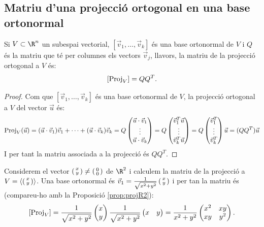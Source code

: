 \subsection{Matriu d'una projecció ortogonal en una base ortonormal}
\begin{proposicio}
Si $V\subset \R^n$ un subespai vectorial, $[\vec v_1, \dots, \vec v_k]$ és una base ortonormal de $V$ i $Q$ és la matriu que té per columnes els vectors $\vec v_j$, llavors, la matriu de la projecció ortogonal a $V$ és:
\[
[\operatorname{Proj}_V]=Q Q^T.
\]
\end{proposicio}
 \begin{proof}
 Com que $[\vec v_1, \dots, \vec v_k]$ és una base ortonormal de $V$, la projecció ortogonal a $V$ del vector $\vec u$ és:
 \[
 \operatorname{Proj}_V(\vec u)=(\vec u\cdot \vec v_1)\vec v_1 + \cdots + (\vec u\cdot \vec v_k)\vec v_k = Q \begin{pmatrix}
 \vec u\cdot \vec v_1 \\ \vdots \\ \vec u\cdot \vec v_k \end{pmatrix}= Q \begin{pmatrix}
 \vec v_1^T \vec u \\ \vdots \\ \vec v_k^T \vec u
 \end{pmatrix} = Q
 \begin{pmatrix}
 \vec v_1^T \\
 \vdots \\
 \vec v_k^T
 \end{pmatrix} \vec u
 =(QQ^T)\vec u
 \]
 I per tant la matriu associada a la projecció és $QQ^T$.
 \end{proof}
\begin{exemple}
Considerem el vector $\left(\begin{smallmatrix}x\\y\end{smallmatrix}\right)\neq\left(\begin{smallmatrix}0\\0\end{smallmatrix}\right)$ de $\R^2$ i calculem la matriu de la projecció a $V=\langle \left(\begin{smallmatrix}x\\y\end{smallmatrix}\right)\rangle$. Una base ortonormal és $\vec v_1=\frac{1}{\sqrt{x^2+y^2}}\left(\begin{smallmatrix}x\\y\end{smallmatrix}\right)$ i per tan la matriu és (compareu-ho amb la Proposició \ref{prop:projR2}):
\[
[\operatorname{Proj}_V]=\frac{1}{\sqrt{x^2+y^2}} \begin{pmatrix} x \\ y \end{pmatrix} \frac{1}{\sqrt{x^2+y^2}} \begin{pmatrix} x & y \end{pmatrix} = \frac{1}{x^2+y^2} \begin{pmatrix} x^2 & xy \\ xy & y^2 \end{pmatrix} .
\]
\end{exemple}
